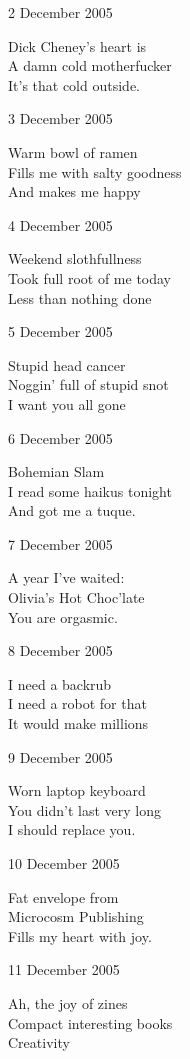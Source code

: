 \documentclass[12pt]{article}
\begin{document}
\newpage

2 December 2005

Dick Cheney's heart is \\
A damn cold motherfucker \\
It's that cold outside. 

3 December 2005

Warm bowl of ramen \\
Fills me with salty goodness \\
And makes me happy 

4 December 2005

Weekend slothfullness \\
Took full root of me today \\
Less than nothing done 

5 December 2005

Stupid head cancer \\
Noggin' full of stupid snot \\
I want you all gone 

6 December 2005

Bohemian Slam \\
I read some haikus tonight \\
And got me a tuque. 

7 December 2005

A year I've waited: \\
Olivia's Hot Choc'late \\
You are orgasmic. 

\newpage

8 December 2005

I need a backrub \\ 
I need a robot for that \\
It would make millions 

9 December 2005

Worn laptop keyboard \\
You didn't last very long \\
I should replace you. 

10 December 2005

Fat envelope from \\
Microcosm Publishing \\
Fills my heart with joy. 

11 December 2005

Ah, the joy of zines \\
Compact interesting books \\
Creativity 
\end{document}
